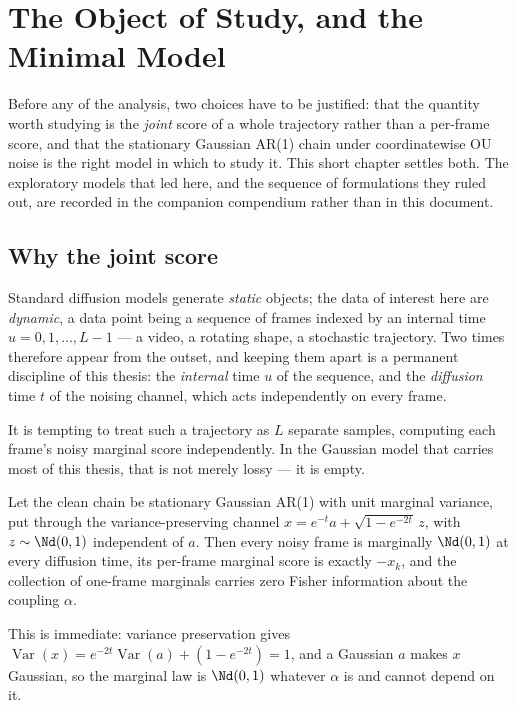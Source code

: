 \chapter{The Object of Study, and the Minimal Model}
\label{ch:development}\label{sec:development}

Before any of the analysis, two choices have to be justified: that the
quantity worth studying is the \emph{joint} score of a whole trajectory
rather than a per-frame score, and that the stationary Gaussian AR(1) chain
under coordinatewise OU noise is the right model in which to study it. This
short chapter settles both. The exploratory models that led here, and the
sequence of formulations they ruled out, are recorded in the companion
compendium rather than in this document.

\section{Why the joint score}\label{sec:dev-correction}

Standard diffusion models generate \emph{static} objects; the data of
interest here are \emph{dynamic}, a data point being a sequence of frames
indexed by an internal time $u = 0, 1, \dots, L-1$ --- a video, a rotating
shape, a stochastic trajectory. Two times therefore appear from the outset,
and keeping them apart is a permanent discipline of this thesis: the
\emph{internal} time $u$ of the sequence, and the \emph{diffusion} time $t$
of the noising channel, which acts independently on every frame.

It is tempting to treat such a trajectory as $L$ separate samples, computing
each frame's noisy marginal score independently. In the Gaussian model that
carries most of this thesis, that is not merely lossy --- it is empty.

\begin{proposition}\label{prop:dev-marginal}
Let the clean chain be stationary Gaussian AR(1) with unit marginal variance,
put through the variance-preserving channel
$x = e^{-t} a + \sqrt{1 - e^{-2t}}\, z$, with $z \sim \Nd(0,1)$ independent of
$a$. Then every noisy frame is marginally $\Nd(0,1)$ at every diffusion time,
its per-frame marginal score is exactly $-x_k$, and the collection of one-frame
marginals carries zero Fisher information about the coupling $\alpha$.
\end{proposition}

\noindent This is immediate: variance preservation gives
$\operatorname{Var}(x) = e^{-2t}\operatorname{Var}(a) + (1 - e^{-2t}) = 1$, and a Gaussian $a$ makes $x$
Gaussian, so the marginal law is $\Nd(0,1)$ whatever $\alpha$ is and cannot
depend on it.

